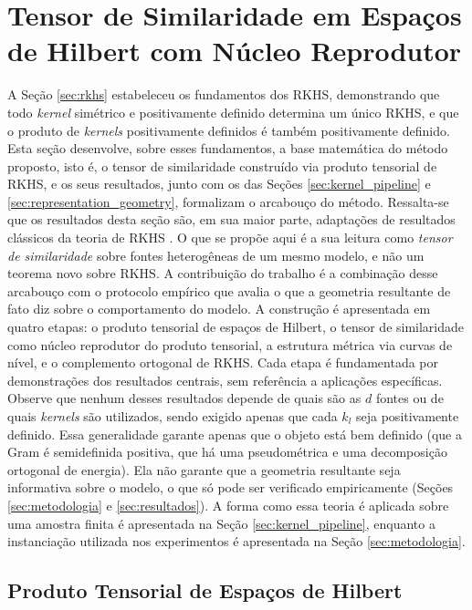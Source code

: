 \section{Tensor de Similaridade em Espaços de Hilbert com Núcleo Reprodutor}\label{sec:tensor_rkhs}

A Seção \ref{sec:rkhs} estabeleceu os fundamentos dos RKHS, demonstrando que todo \textit{kernel} simétrico e positivamente definido determina um único RKHS, e que o produto de \textit{kernels} positivamente definidos é também positivamente definido. Esta seção desenvolve, sobre esses fundamentos, a base matemática do método proposto, isto é, o tensor de similaridade construído via produto tensorial de RKHS, e os seus resultados, junto com os das Seções \ref{sec:kernel_pipeline} e \ref{sec:representation_geometry}, formalizam o arcabouço do método. Ressalta-se que os resultados desta seção são, em sua maior parte, adaptações de resultados clássicos da teoria de RKHS \citep{Aronszajn1950, BerlinetThomas2004, PaulsenRaghupathi2016}. O que se propõe aqui é a sua leitura como \emph{tensor de similaridade} sobre fontes heterogêneas de um mesmo modelo, e não um teorema novo sobre RKHS. A contribuição do trabalho é a combinação desse arcabouço com o protocolo empírico que avalia o que a geometria resultante de fato diz sobre o comportamento do modelo. A construção é apresentada em quatro etapas: o produto tensorial de espaços de Hilbert, o tensor de similaridade como núcleo reprodutor do produto tensorial, a estrutura métrica via curvas de nível, e o complemento ortogonal de RKHS. Cada etapa é fundamentada por demonstrações dos resultados centrais, sem referência a aplicações específicas. Observe que nenhum desses resultados depende de quais são as $d$ fontes ou de quais \textit{kernels} são utilizados, sendo exigido apenas que cada $k_l$ seja positivamente definido. Essa generalidade garante apenas que o objeto está bem definido (que a Gram é semidefinida positiva, que há uma pseudométrica e uma decomposição ortogonal de energia). Ela não garante que a geometria resultante seja informativa sobre o modelo, o que só pode ser verificado empiricamente (Seções \ref{sec:metodologia} e \ref{sec:resultados}). A forma como essa teoria é aplicada sobre uma amostra finita é apresentada na Seção \ref{sec:kernel_pipeline}, enquanto a instanciação utilizada nos experimentos é apresentada na Seção \ref{sec:metodologia}.

\subsection{Produto Tensorial de Espaços de Hilbert}

